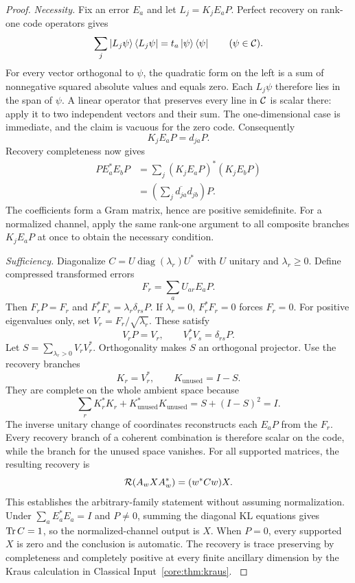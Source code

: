 \begin{proof}\label{core:proof:016}
\textit{Necessity.} Fix an error $E_a$ and let $L_j=K_jE_aP$. Perfect recovery on rank-one code operators gives
\[
\sum_j\ket{L_j\psi}\bra{L_j\psi}
=t_a\ket\psi\bra\psi\qquad(\psi\in\cC).
\]
For every vector orthogonal to $\psi$, the quadratic form on the left is a sum of nonnegative squared absolute values and equals zero. Each $L_j\psi$ therefore lies in the span of $\psi$. A linear operator that preserves every line in $\cC$ is scalar there: apply it to two independent vectors and their sum. The one-dimensional case is immediate, and the claim is vacuous for the zero code. Consequently
\[
K_jE_aP=d_{ja}P.
\]
Recovery completeness now gives
\[
\begin{aligned}
PE_a^*E_bP
&=\sum_j (K_jE_aP)^*(K_jE_bP)\\
&=\left(\sum_j\overline{d_{ja}}d_{jb}\right)P.
\end{aligned}
\]
The coefficients form a Gram matrix, hence are positive semidefinite. For a normalized channel, apply the same rank-one argument to all composite branches $K_jE_aP$ at once to obtain the necessary condition.

\textit{Sufficiency.} Diagonalize $C=U\operatorname{diag}(\lambda_r)U^*$ with $U$ unitary and $\lambda_r\ge0$. Define compressed transformed errors
\[
F_r=\sum_aU_{ar}E_aP.
\]
Then $F_rP=F_r$ and $F_r^*F_s=\lambda_r\delta_{rs}P$. If $\lambda_r=0$, $F_r^*F_r=0$ forces $F_r=0$. For positive eigenvalues only, set $V_r=F_r/\sqrt{\lambda_r}$. These satisfy
\[
V_rP=V_r,\qquad V_r^*V_s=\delta_{rs}P.
\]
Let $S=\sum_{\lambda_r>0}V_rV_r^*$. Orthogonality makes $S$ an orthogonal projector. Use the recovery branches
\[
K_r=V_r^*,\qquad K_{\mathrm{unused}}=I-S.
\]
They are complete on the whole ambient space because
\[
\sum_rK_r^*K_r+K_{\mathrm{unused}}^*K_{\mathrm{unused}}
=S+(I-S)^2=I.
\]
The inverse unitary change of coordinates reconstructs each $E_aP$ from the $F_r$. Every recovery branch of a coherent combination is therefore scalar on the code, while the branch for the unused space vanishes. For all supported matrices, the resulting recovery is
\[
\cR(A_wXA_w^*)=(w^*Cw)X.
\]
This establishes the arbitrary-family statement without assuming normalization. Under $\sum_aE_a^*E_a=I$ and $P\ne0$, summing the diagonal KL equations gives $\operatorname{Tr} C=1$, so the normalized-channel output is $X$. When $P=0$, every supported $X$ is zero and the conclusion is automatic. The recovery is trace preserving by completeness and completely positive at every finite ancillary dimension by the Kraus calculation in Classical Input~\ref{core:thm:kraus}.
\label{core:proof:016:end}\end{proof}

